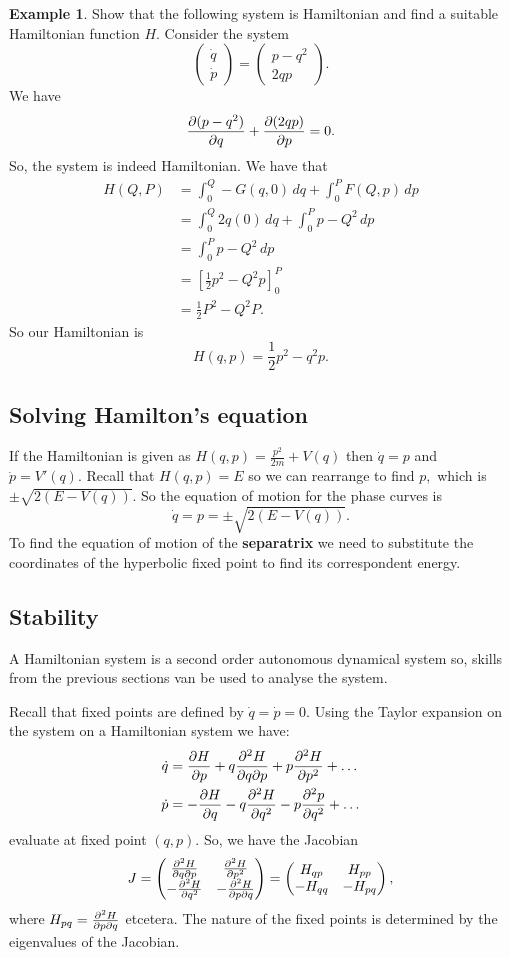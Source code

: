 \documentclass[12pt, a4paper]{article}
\newcommand{\f}[2]{\frac{#1}{#2}}
\theoremstyle{definition}
\newtheorem*{example}{Example}
\theoremstyle{plain}
\begin{document}
\begin{example}
Show that the following system is Hamiltonian and find a suitable Hamiltonian function $H.$ Consider the system $$\begin{pmatrix} \dot{q} \\ \dot{p} \end{pmatrix} =\begin{pmatrix} p-q^2 \\ 2qp \end{pmatrix}.$$ We have $$\pdv{(p-q^2)}{q}+\pdv{(2qp)}{p}=0.$$ So, the system is indeed Hamiltonian. We have that $$\begin{aligned}
H(Q,P)	&=\int_0^Q -G(q,0) \, dq +\int_0^P F(Q,p) \, dp \\
		&=\int_0^Q 2q(0) \, dq + \int_0^P p-Q^2 \, dp \\
		&=\int_0^P p-Q^2 \, dp \\
		&=\left[\f{1}{2}p^2 -Q^2p\right]_0^P \\
		&=\f{1}{2}P^2 -Q^2P.
\end{aligned}$$ So our Hamiltonian is $$H(q,p)=\f{1}{2}p^2-q^2p.$$
\end{example}

\subsection{Solving Hamilton's equation}

If the Hamiltonian is given as $H(q,p)=\f{p^2}{2m}+V(q)$ then $\dot{q}=p$ and $\dot{p}=V'(q).$ Recall that $H(q,p)=E$ so we can rearrange to find $p,$ which is $\pm\sqrt{2(E-V(q))}.$ So the equation of motion for the phase curves is $$\dot{q}=p=\pm\sqrt{2(E-V(q))}.$$ To find the equation of motion of the \textbf{separatrix} we need to substitute the coordinates of the hyperbolic fixed point to find its correspondent energy.

\subsection{Stability}

A Hamiltonian system is a second order autonomous dynamical system so, skills from the previous sections van be used to analyse the system.

Recall that fixed points are defined by $\dot{q}=\dot{p}=0.$ Using the Taylor expansion on the system on a Hamiltonian system we have: $$\begin{aligned}
\dot{q} &=\pdv{H}{p}+q\pdv[2]{H}{q}{p}+p\pdv[2]{H}{p}+\ldots \\
\dot{p} &=-\pdv{H}{q}-q\pdv[2]{H}{q}-p\pdv[2]{p}{q} + \ldots
\end{aligned}$$ evaluate at fixed point $(q,p)$. So, we have the Jacobian $$J=\begin{pmatrix} \pdv[2]{H}{q}{p} & \pdv[2]{H}{p} \\ -\pdv[2]{H}{q} & -\pdv[2]{H}{p}{q} \end{pmatrix} = \begin{pmatrix} H_{qp} &H_{pp} \\ -H_{qq} & -H_{pq} \end{pmatrix},$$ where $H_{pq} =\pdv[2]{H}{p}{q}$ etcetera. The nature of the fixed points is determined by the eigenvalues of the Jacobian.
\end{document}
